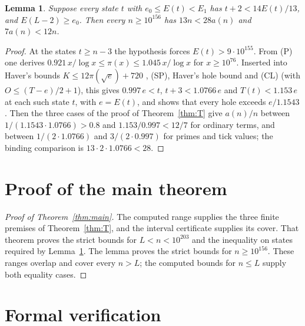 \documentclass[11pt]{article}
\newtheorem{lemma}[theorem]{Lemma}
\theoremstyle{definition}
\theoremstyle{remark}
\begin{document}
\begin{lemma}\label{lem:F}
Suppose every state $t$ with $e_0\le E(t)<E_1$ has $t+2<14E(t)/13$, and
$E(L-2)\ge e_0$. Then every $n\ge10^{156}$ has $13n<28a(n)$ and
$7a(n)<12n$.
\end{lemma}

\begin{proof}
At the states $t\ge n-3$ the hypothesis forces $E(t)>9\cdot10^{155}$. From
(P) one derives $0.921\,x/\log x\le\pi(x)\le1.045\,x/\log x$ for
$x\ge10^{76}$. Inserted into Haver's bounds $K\le12\pi(\sqrt e)+720$
\cite[Theorem~5]{haver}, (SP), Haver's hole bound and (CL) (with
$O\le(T-e)/2+1$), this gives $0.997\,e<t$, $t+3<1.0766\,e$ and $T(t)<1.153\,e$ at
each such state $t$, with $e=E(t)$, and shows that every hole exceeds
$e/1.1543$. Then the three cases of the proof of Theorem~\ref{thm:T}
give $a(n)/n$ between $1/(1.1543\cdot1.0766)>0.8$ and $1.153/0.997<12/7$
for ordinary terms, and between $1/(2\cdot1.0766)$ and $3/(2\cdot0.997)$
for primes and tick values; the binding comparison is
$13\cdot2\cdot1.0766<28$.
\end{proof}

\section{Proof of the main theorem}

\begin{proof}[Proof of Theorem~\ref{thm:main}]
The computed range supplies the three finite premises of
Theorem~\ref{thm:T}, and the interval certificate supplies its cover.
That theorem proves the strict bounds for $L<n<10^{203}$ and the
inequality on states required by Lemma~\ref{lem:F}. The lemma proves the
strict bounds for $n\ge10^{156}$. These ranges overlap and cover every
$n>L$; the computed bounds for $n\le L$ supply both equality cases.
\end{proof}

\section{Formal verification}\label{sec:trust}
\end{document}
